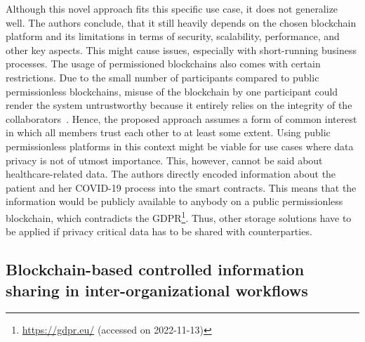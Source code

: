 Although this novel approach fits this specific use case, it does not generalize well. The authors conclude, that it still heavily depends on the chosen blockchain platform and its limitations in terms of security, scalability, performance, and other key aspects. This might cause issues, especially with short-running business processes. The usage of permissioned blockchains also comes with certain restrictions. Due to the small number of participants compared to public permissionless blockchains, misuse of the blockchain by one participant could render the system untrustworthy because it entirely relies on the integrity of the collaborators~\cite{lamport2002,sousa12from_byzan_consen_bft_state_machin_replic}. Hence, the proposed approach assumes a form of common interest in which all members trust each other to at least some extent. Using public permissionless platforms in this context might be viable for use cases where data privacy is not of utmost importance. This, however, cannot be said about healthcare-related data. The authors directly encoded information about the patient and her COVID-19 process into the smart contracts. This means that the information would be publicly available to anybody on a public permissionless blockchain, which contradicts the GDPR\footnote{\url{https://gdpr.eu/} (accessed on 2022-11-13)}. Thus, other storage solutions have to be applied if privacy critical data has to be shared with counterparties.


\subsection{Blockchain-based controlled information sharing in inter-organizational workflows~\cite{blockchain_based_information_sharing_in_io_workflows}}

